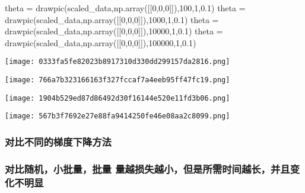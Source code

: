 \documentclass[
]{article}
\newenvironment{Shaded}{}{}
\newcommand{\DecValTok}[1]{\textcolor[rgb]{0.25,0.63,0.44}{#1}}
\newcommand{\FloatTok}[1]{\textcolor[rgb]{0.25,0.63,0.44}{#1}}
\newcommand{\NormalTok}[1]{#1}
\newcommand{\OperatorTok}[1]{\textcolor[rgb]{0.40,0.40,0.40}{#1}}
\begin{document}
\begin{Shaded}
\begin{Highlighting}[]
\NormalTok{theta }\OperatorTok{=}\NormalTok{ drawpic(scaled\_data,np.array([[}\DecValTok{0}\NormalTok{,}\DecValTok{0}\NormalTok{,}\DecValTok{0}\NormalTok{]]),}\DecValTok{100}\NormalTok{,}\DecValTok{1}\NormalTok{,}\FloatTok{0.1}\NormalTok{)}
\NormalTok{theta }\OperatorTok{=}\NormalTok{ drawpic(scaled\_data,np.array([[}\DecValTok{0}\NormalTok{,}\DecValTok{0}\NormalTok{,}\DecValTok{0}\NormalTok{]]),}\DecValTok{1000}\NormalTok{,}\DecValTok{1}\NormalTok{,}\FloatTok{0.1}\NormalTok{)}
\NormalTok{theta }\OperatorTok{=}\NormalTok{ drawpic(scaled\_data,np.array([[}\DecValTok{0}\NormalTok{,}\DecValTok{0}\NormalTok{,}\DecValTok{0}\NormalTok{]]),}\DecValTok{10000}\NormalTok{,}\DecValTok{1}\NormalTok{,}\FloatTok{0.1}\NormalTok{)}
\NormalTok{theta }\OperatorTok{=}\NormalTok{ drawpic(scaled\_data,np.array([[}\DecValTok{0}\NormalTok{,}\DecValTok{0}\NormalTok{,}\DecValTok{0}\NormalTok{]]),}\DecValTok{100000}\NormalTok{,}\DecValTok{1}\NormalTok{,}\FloatTok{0.1}\NormalTok{)}
\end{Highlighting}
\end{Shaded}

\texttt{[image: 0333fa5fe82023b8917310d330dd299157da2816.png]}

\texttt{[image: 766a7b323166163f327fccaf7a4eeb95ff47fc19.png]}

\texttt{[image: 1904b529ed87d86492d30f16144e520e11fd3b06.png]}

\texttt{[image: 567b3f7692e27e88fa9414250fe46e08aa2c8099.png]}

\begin{Shaded}
\begin{Highlighting}[]

\end{Highlighting}
\end{Shaded}

\hypertarget{ux5bf9ux6bd4ux4e0dux540cux7684ux68afux5ea6ux4e0bux964dux65b9ux6cd5}{%
\subsubsection{对比不同的梯度下降方法}\label{ux5bf9ux6bd4ux4e0dux540cux7684ux68afux5ea6ux4e0bux964dux65b9ux6cd5}}

\hypertarget{ux5bf9ux6bd4ux968fux673aux5c0fux6279ux91cfux6279ux91cf-ux91cfux8d8aux635fux5931ux8d8aux5c0fux4f46ux662fux6240ux9700ux65f6ux95f4ux8d8aux957fux5e76ux4e14ux53d8ux5316ux4e0dux660eux663e}{%
\subsubsection{对比随机，小批量，批量
量越损失越小，但是所需时间越长，并且变化不明显}\label{ux5bf9ux6bd4ux968fux673aux5c0fux6279ux91cfux6279ux91cf-ux91cfux8d8aux635fux5931ux8d8aux5c0fux4f46ux662fux6240ux9700ux65f6ux95f4ux8d8aux957fux5e76ux4e14ux53d8ux5316ux4e0dux660eux663e}}
\end{document}
